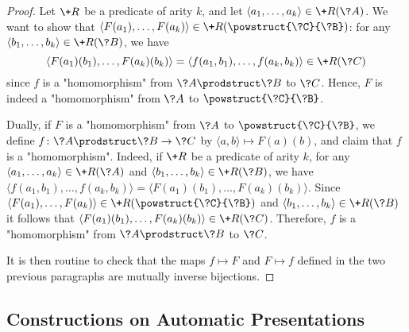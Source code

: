 \begin{proof}
Let $\+R$ be a predicate of arity $k$, and let
$\langle a_1,\hdots,a_k \rangle \in \+R(\?A)$.
We want to show that $\langle F(a_1),\hdots,F(a_k) \rangle \in \+R(\powstruct{\?C}{\?B})$:
for any $\langle b_1,\hdots,b_k \rangle \in \+R(\?B)$, we have
\[\langle F(a_1)(b_1), \hdots, F(a_k)(b_k)\rangle = \langle f(a_1,b_1),\hdots,f(a_k,b_k) \rangle \in \+R(\?C)\] since $f$ is a "homomorphism" from $\?A\prodstruct \?B$ to $\?C$.
Hence, $F$ is indeed a "homomorphism" from $\?A$ to $\powstruct{\?C}{\?B}$.

Dually, if $F$ is a "homomorphism" from $\?A$ to $\powstruct{\?C}{\?B}$,
we define $f\colon \?A\prodstruct \?B \to \?C$ by $\langle a,b \rangle \mapsto F(a)(b)$,
and claim that $f$ is a "homomorphism". Indeed, if $\+R$ be a predicate of arity $k$,
for any $\langle a_1, \hdots, a_k \rangle \in \+R(\?A)$
and $\langle b_1, \hdots, b_k \rangle \in \+R(\?B)$,
we have $\langle f(a_1,b_1), \hdots, f(a_k,b_k) \rangle
= \langle F(a_1)(b_1), \hdots, F(a_k)(b_k) \rangle$.
Since $\langle F(a_1), \hdots, F(a_k) \rangle \in \+R(\powstruct{\?C}{\?B})$
and $\langle b_1, \hdots,b_k \rangle \in \+R(\?B)$ 
it follows that $\langle F(a_1)(b_1), \hdots, F(a_k)(b_k) \rangle \in \+R(\?C)$.
Therefore, $f$ is a "homomorphism" from $\?A \prodstruct \?B$ to $\?C$.

It is then routine to check that the maps $f \mapsto F$ and $F \mapsto f$ defined
in the two previous paragraphs are mutually inverse bijections.
\end{proof}

\subsection{Constructions on Automatic Presentations}
\label{sec:construction-automatic-presentations}

